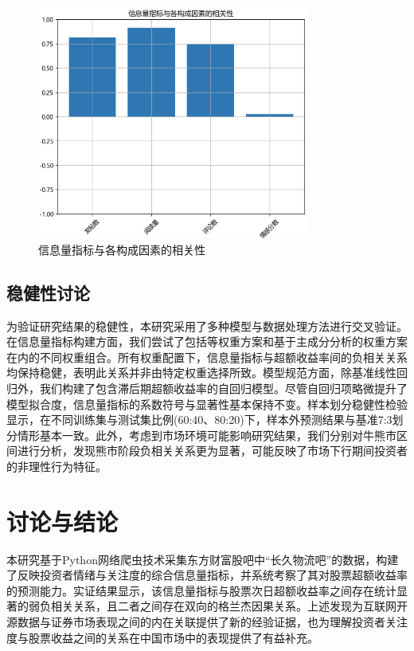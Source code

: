 \documentclass[12pt, a4paper]{article}
\begin{document}
\begin{figure}[htbp]
\centering
\includegraphics[width=0.8\textwidth]{fig/component_correlation.png}
\caption{信息量指标与各构成因素的相关性}
\label{fig:component_correlation}
\end{figure}

\subsection{稳健性讨论}

为验证研究结果的稳健性，本研究采用了多种模型与数据处理方法进行交叉验证。在信息量指标构建方面，我们尝试了包括等权重方案和基于主成分分析的权重方案在内的不同权重组合。所有权重配置下，信息量指标与超额收益率间的负相关关系均保持稳健，表明此关系并非由特定权重选择所致。模型规范方面，除基准线性回归外，我们构建了包含滞后期超额收益率的自回归模型。尽管自回归项略微提升了模型拟合度，信息量指标的系数符号与显著性基本保持不变。样本划分稳健性检验显示，在不同训练集与测试集比例(60:40、80:20)下，样本外预测结果与基准7:3划分情形基本一致。此外，考虑到市场环境可能影响研究结果，我们分别对牛熊市区间进行分析，发现熊市阶段负相关关系更为显著，可能反映了市场下行期间投资者的非理性行为特征。

\section{讨论与结论}

本研究基于Python网络爬虫技术采集东方财富股吧中“长久物流吧”的数据，构建了反映投资者情绪与关注度的综合信息量指标，并系统考察了其对股票超额收益率的预测能力。实证结果显示，该信息量指标与股票次日超额收益率之间存在统计显著的弱负相关关系，且二者之间存在双向的格兰杰因果关系。上述发现为互联网开源数据与证券市场表现之间的内在关联提供了新的经验证据，也为理解投资者关注度与股票收益之间的关系在中国市场中的表现提供了有益补充。
\end{document}
